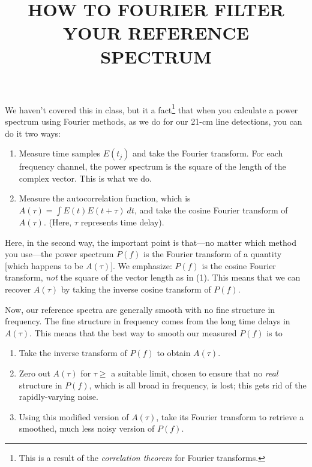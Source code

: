 \documentclass[preprint]{aastex}
\begin{document}
                                                                                
\def\simlt{\lower.5ex\hbox{$\; \buildrel < \over \sim \;$}}
\def\simgt{\lower.5ex\hbox{$\; \buildrel > \over \sim \;$}}
                                                                                
\title{HOW TO FOURIER FILTER YOUR REFERENCE SPECTRUM}

We haven't covered this in class, but it a fact\footnote{This is a
  result of the {\it correlation theorem} for Fourier transforms.} that when you calculate
a power spectrum using Fourier methods, as we do for our 21-cm line
detections, you can do it two ways: \begin{enumerate}

\item Measure time samples $E(t_j)$ and take the Fourier transform. For
  each frequency channel, the power spectrum is the square of the
  length of the complex vector. This is what we do.

\item Measure the autocorrelation function, which is $A(\tau) = \int
  E(t) E(t+\tau) \ dt$, and take the cosine Fourier transform of
  $A(\tau)$. (Here, $\tau$ represents time delay). 

\end{enumerate}

\noindent Here, in the second way, the important point is that---no
matter which method you use---the power
spectrum $P(f)$ is the Fourier transform of a quantity [which happens
to be $A(\tau)$]. We emphasize: $P(f)$ is the cosine Fourier transform,
{\it not} the square of the vector length as in (1). This means that we
can recover $A(\tau)$ by taking the inverse cosine transform of $P(f)$.

Now, our reference spectra are generally smooth with no fine structure
in frequency. The fine structure in frequency comes from the long time
delays in $A(\tau)$. This means that the best way to smooth our measured $P(f)$
is to \begin{enumerate}

\item Take the inverse transform of $P(f)$ to obtain $A(\tau)$.

\item Zero out $A(\tau)$
for $\tau \ge$ a suitable limit, chosen to ensure that no {\it real}
structure in $P(f)$, which is all broad in frequency, is lost; this
gets rid of the rapidly-varying noise.

\item Using
this modified version of $A(\tau)$, take its Fourier transform to
retrieve a smoothed, much less noisy version of $P(f)$.

\end{enumerate}
\end{document}
